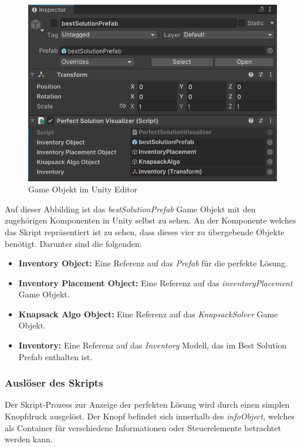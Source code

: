 \begin{figure}[H]
\centering
\includegraphics[scale=0.8]{images/bestSolPref_Editor}
\caption{Game Objekt im Unity Editor}
\label{fig:bestSol_Editor}
\end{figure}

Auf dieser Abbilding ist das \textit{bestSolutionPrefab} Game Objekt mit den zugehörigen Komponenten in Unity selbst zu
sehen. An der Komponente welches das Skript repräsentiert ist zu sehen, dass dieses vier zu übergebende Objekte benötigt.
Darunter sind die folgenden:
\begin{itemize}
    \item \textbf{Inventory Object:} Eine Referenz auf das \textit{Prefab} für die perfekte Lösung.
    \item \textbf{Inventory Placement Object:} Eine Referenz auf das \textit{inventoryPlacement} Game Objekt.
    \item \textbf{Knapsack Algo Object:} Eine Referenz auf das \textit{KnapsackSolver} Game Objekt.
    \item \textbf{Inventory:} Eine Referenz auf das \textit{Inventory} Modell, das im Best Solution Prefab enthalten ist.
\end{itemize}

\subsubsection{Auslöser des Skripts}
Der Skript-Prozess zur Anzeige der perfekten Lösung wird durch einen simplen Knopfdruck ausgelöst. Der Knopf befindet
sich innerhalb des \textit{infoObject}, welches als Container für verschiedene Informationen oder Steuerelemente betrachtet
werden kann.

